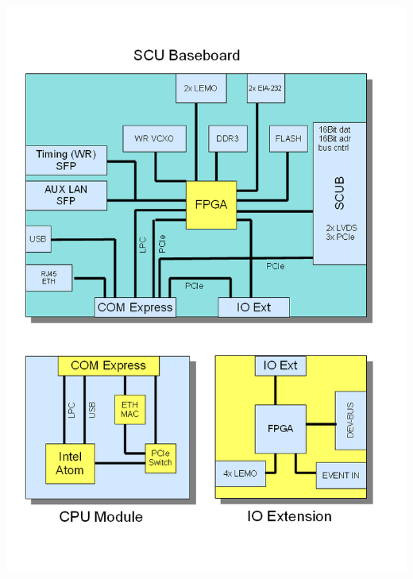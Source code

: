 \documentclass[25pt,halfparskip-,pagesize]{scrartcl}
\begin{document}
\begin{multicols*}{3}
\includegraphics[width=\columnwidth]{../images/scu_schema}







\end{multicols*}
\end{document}
